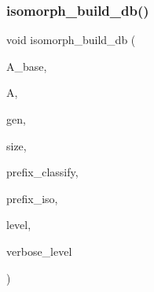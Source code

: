 \subsubsection{\texorpdfstring{isomorph\+\_\+build\+\_\+db()}{isomorph\_build\_db()}}
{\footnotesize\ttfamily void isomorph\+\_\+build\+\_\+db (\begin{DoxyParamCaption}\item[{\mbox{\hyperlink{classaction}{action}} $\ast$}]{A\+\_\+base,  }\item[{\mbox{\hyperlink{classaction}{action}} $\ast$}]{A,  }\item[{\mbox{\hyperlink{classgenerator}{generator}} $\ast$}]{gen,  }\item[{\mbox{\hyperlink{galois_8h_a09fddde158a3a20bd2dcadb609de11dc}{I\+NT}}}]{size,  }\item[{const \mbox{\hyperlink{galois_8h_ab6cc7b4aeb6ea31aba2b3fbfc83ff5e6}{B\+Y\+TE}} $\ast$}]{prefix\+\_\+classify,  }\item[{const \mbox{\hyperlink{galois_8h_ab6cc7b4aeb6ea31aba2b3fbfc83ff5e6}{B\+Y\+TE}} $\ast$}]{prefix\+\_\+iso,  }\item[{\mbox{\hyperlink{galois_8h_a09fddde158a3a20bd2dcadb609de11dc}{I\+NT}}}]{level,  }\item[{\mbox{\hyperlink{galois_8h_a09fddde158a3a20bd2dcadb609de11dc}{I\+NT}}}]{verbose\+\_\+level }\end{DoxyParamCaption})}

\mbox{\label{isomorph__global_8_c_a027e803e6cab7af4c400a71663bf4715}} 
